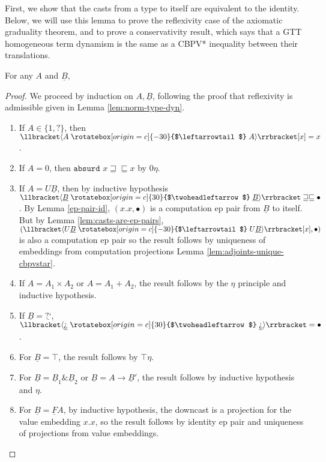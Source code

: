 \documentclass[acmsmall,screen,12pt]{acmart}
\renewcommand{\u}{\underline}
\newcommand{\cbpvstar}{CBPV*}
\newcommand{\sem}[1]{\llbracket#1\rrbracket}
\newcommand{\sdncast}[2]{\sem{\dncast{#1}{#2}}}
\newcommand{\supcast}[2]{\sem{\upcast{#1}{#2}}}
\newcommand{\ltdyn}{\sqsubseteq}
\newcommand{\gtdyn}{\sqsupseteq}
\newcommand{\equidyn}{\mathrel{\gtdyn\ltdyn}}
\newcommand{\dynv}{{?}}
\newcommand{\dync}{\u {\text{?`}}}
\newcommand{\uarrow}{\mathrel{\rotatebox[origin=c]{-30}{$\leftarrowtail$}}}
\newcommand{\darrow}{\mathrel{\rotatebox[origin=c]{30}{$\twoheadleftarrow$}}}
\newcommand{\upcast}[2]{\langle{#2}\uarrow{#1}\rangle}
\newcommand{\dncast}[2]{\langle{#1}\darrow{#2}\rangle}
\newcommand{\kw}[1]{\texttt{#1}\,\,}
\newcommand{\absurd}{\kw{absurd}}
\newcommand{\with}{\mathbin{\&}}
\begin{document}
\begin{longonly}
First, we show that the casts from a type to itself are equivalent to
the identity.
%
Below, we will use this lemma to prove the reflexivity case of the
axiomatic graduality theorem, and to prove a conservativity result,
which says that a GTT homogeneous term dynamism is the same as a
\cbpvstar\/ inequality between their translations.
\begin{lemma}
  \label{lem:ident-expansion}
  For any $A$ and $\u B$,
\end{lemma}
\begin{proof}
  We proceed by induction on $A, \u B$, following the proof that
  reflexivity is admissible given in Lemma \ref{lem:norm-type-dyn}.
  \begin{enumerate}
  \item If $A \in \{1, \dynv \}$, then $\supcast{A}{A}[x] = x$.
  \item If $A = 0$, then $\absurd x \equidyn x$ by $0\eta$.
  \item If $A = U \u B$, then by inductive hypothesis $\sdncast{\u
    B}{\u B} \equidyn \bullet$. By Lemma \ref{ep-pair-id},
    $(x. x, \bullet)$ is a computation ep pair from $\u B$ to
    itself. But by Lemma \ref{lem:casts-are-ep-pairs}, $(\supcast{U\u
      B}{U\u B}[x], \bullet)$ is also a computation ep pair so the
    result follows by uniqueness of embeddings from computation
    projections Lemma \ref{lem:adjoints-unique-cbpvstar}.
  \item If $A = A_1\times A_2$ or $A = A_1+A_2$, the result follows by
    the $\eta$ principle and inductive hypothesis.
  \item If $\u B = \dync$, $\sdncast{\dync}{\dync} = \bullet$.
  \item For $\u B = \top$, the result follows by $\top\eta$.
  \item For $\u B = \u B_1 \with \u B_2$ or $\u B = A \to \u B'$, the
    result follows by inductive hypothesis and $\eta$.
  \item For $\u B = \u FA$, by inductive hypothesis, the downcast is a
    projection for the value embedding $x.x$, so the result follows by
    identity ep pair and uniqueness of projections from value
    embeddings.
  \end{enumerate}
\end{proof}


\end{longonly}
\end{document}
